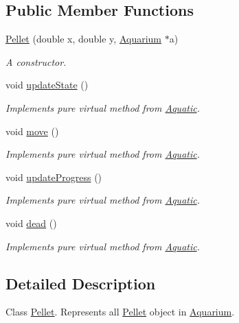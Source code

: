 \subsection*{Public Member Functions}
\begin{DoxyCompactItemize}
\item 
\mbox{\hyperlink{class_pellet_a82237bc71b41264e30874248e68c36b5}{Pellet}} (double x, double y, \mbox{\hyperlink{class_aquarium}{Aquarium}} $\ast$a)
\begin{DoxyCompactList}\small\item\em A constructor. \end{DoxyCompactList}\item 
void \mbox{\hyperlink{class_pellet_ab21f88899eba022e1693d911eba9dbfb}{update\+State}} ()
\begin{DoxyCompactList}\small\item\em Implements pure virtual method from \mbox{\hyperlink{class_aquatic}{Aquatic}}. \end{DoxyCompactList}\item 
void \mbox{\hyperlink{class_pellet_a7385101b04083be663ae465c38fd2a4d}{move}} ()
\begin{DoxyCompactList}\small\item\em Implements pure virtual method from \mbox{\hyperlink{class_aquatic}{Aquatic}}. \end{DoxyCompactList}\item 
void \mbox{\hyperlink{class_pellet_a1a7203cff52c771eb8cc62a91620e3ca}{update\+Progress}} ()
\begin{DoxyCompactList}\small\item\em Implements pure virtual method from \mbox{\hyperlink{class_aquatic}{Aquatic}}. \end{DoxyCompactList}\item 
void \mbox{\hyperlink{class_pellet_a50bfc2589da43b06640bc5504e3c689b}{dead}} ()
\begin{DoxyCompactList}\small\item\em Implements pure virtual method from \mbox{\hyperlink{class_aquatic}{Aquatic}}. \end{DoxyCompactList}\end{DoxyCompactItemize}


\subsection{Detailed Description}
Class \mbox{\hyperlink{class_pellet}{Pellet}}. Represents all \mbox{\hyperlink{class_pellet}{Pellet}} object in \mbox{\hyperlink{class_aquarium}{Aquarium}}. 

